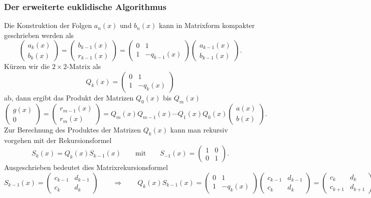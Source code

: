 \subsubsection{Der erweiterte euklidische Algorithmus}
Die Konstruktion der Folgen $a_n(x)$ und $b_n(x)$ kann in Matrixform
kompakter geschrieben werden als
\[
\begin{pmatrix}
a_k(x)\\
b_k(x)
\end{pmatrix}
=
\begin{pmatrix}
b_{k-1}(x)\\
r_{k-1}(x)
\end{pmatrix}
=
\begin{pmatrix}
0 & 1\\
1 & -q_{k-1}(x)
\end{pmatrix}
\begin{pmatrix}
a_{k-1}(x)\\
b_{k-1}(x)
\end{pmatrix}.
\]
Kürzen wir die $2\times 2$-Matrix als
\[
Q_k(x) = \begin{pmatrix} 0&1\\1&-q_k(x)\end{pmatrix}
\]
ab, dann ergibt das Produkt der Matrizen $Q_0(x)$ bis $Q_{m}(x)$
\[
\begin{pmatrix}
g(x)\\
0
\end{pmatrix}
=
\begin{pmatrix}
r_{m-1}(x)\\
r_{m}(x)
\end{pmatrix}
=
Q_{m}(x)
Q_{m-1}(x)
\cdots
Q_1(x)
Q_0(x)
\begin{pmatrix}
a(x)\\
b(x)
\end{pmatrix}.
\]
Zur Berechnung des Produktes der Matrizen $Q_k(x)$ kann man rekursiv
vorgehen mit der Rekursionsformel
\[
S_{k}(x) = Q_{k}(x) S_{k-1}(x)
\qquad\text{mit}\qquad
S_{-1}(x)
=
\begin{pmatrix} 1 & 0 \\ 0 & 1 \end{pmatrix}.
\]
Ausgeschrieben bedeutet dies Matrixrekursionsformel
\[
S_{k-1}(x)
=
\begin{pmatrix} 
c_{k-1} & d_{k-1} \\
c_k     & d_k
\end{pmatrix}
\qquad\Rightarrow\qquad
Q_{k}(x) S_{k-1}(x)
=
\begin{pmatrix}
0&1\\1&-q_k(x)
\end{pmatrix}
\begin{pmatrix} 
c_{k-1} & d_{k-1} \\
c_k     & d_k
\end{pmatrix}
=
\begin{pmatrix}
c_k&d_k\\
c_{k+1}&d_{k+1}
\end{pmatrix}.
\]

